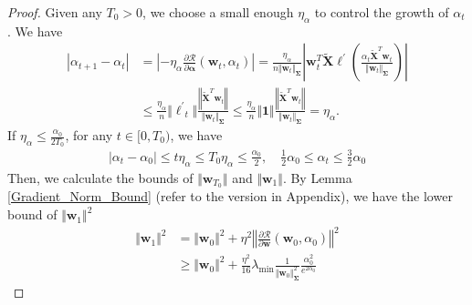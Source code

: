 \documentclass[pdflatex,sn-basic]{sn-jnl}%
\theoremstyle{thmstyleone}%
\begin{document}
\begin{appendices}
\begin{proof}
  Given any $T_0 > 0$, we choose a small enough $\eta_{\alpha}$ to control the growth of $\alpha_{t}$. 
  We have 
  \begin{equation*}
  \begin{aligned}
    \left| \alpha_{t+1} - \alpha_t \right|
    &= 
    \left| - \eta_{\alpha}\frac{\partial \mathcal{R}}{\partial \mathbf{\alpha}} \left(\mathbf{w}_t, \alpha_t \right) \right|
    =
    \frac{ \eta_{\alpha} }{n \Vert \mathbf{w}_t \Vert_\mathbf{\Sigma}}
    \left| 
      \mathbf{w}_t^T \tilde{\mathbf{X}}
      \boldsymbol{\ell^\prime}\left(
        \frac{
        \alpha_t \tilde{\mathbf{X}}^T \mathbf{w}_t
        }{\Vert \mathbf{w}_t \Vert_\mathbf{\Sigma}}
      \right)
    \right|
    \\ & \le
    \frac{\eta_{\alpha}}{n} \Vert \boldsymbol{\ell^{\prime}}_t \Vert 
    \frac{\left\Vert \tilde{\mathbf{X}}^T \mathbf{w}_t \right\Vert}{\Vert \mathbf{w}_t \Vert_{\mathbf{\Sigma}}}
    \le
    \frac{\eta_{\alpha}}{n} \Vert \mathbf{1} \Vert 
    \frac{\left\Vert \tilde{\mathbf{X}}^T \mathbf{w}_t \right\Vert}{\Vert \mathbf{w}_t \Vert_{\mathbf{\Sigma}}}
    = \eta_{\alpha}.
  \end{aligned}
  \end{equation*}
  If $\eta_{\alpha} \le \frac{\alpha_0}{2 T_0}$, for any $t \in [0, T_0)$, we have 
  \begin{equation*}
  \begin{aligned}
    | \alpha_{t} - \alpha_0 | \le t \eta_{\alpha} \le T_0 \eta_{\alpha} \le \frac{\alpha_0}{2},
    \quad 
    \frac{1}{2} \alpha_0 \le \alpha_{t} \le \frac{3}{2} \alpha_0
  \end{aligned}
  \end{equation*}
  Then, we calculate the bounds of $\Vert \mathbf{w}_{T_0} \Vert$ and $\Vert \mathbf{w}_{1} \Vert$. 
  By Lemma \ref{Gradient_Norm_Bound} (refer to the version in Appendix), we have the lower bound of $\Vert \mathbf{w}_{1} \Vert^2$
  \begin{equation*}
  \begin{aligned}
    \Vert \mathbf{w}_{1} \Vert^2 
    & = 
    \Vert \mathbf{w}_{0} \Vert^2 
    + \eta^2 
    \left\Vert 
        \frac{\partial \mathcal{R}}{\partial \mathbf{w}} \left(\mathbf{w}_0, \alpha_0\right)
    \right\Vert^2
    \\ & \ge 
    \Vert \mathbf{w}_{0} \Vert^2  
    + 
    \frac{\eta^2 }{16}
    \lambda_{\min}
    \frac{1}{\Vert \mathbf{w}_0 \Vert_{\mathbf{\Sigma}}^2}
    \frac{\alpha_0^2}{e^{2\alpha_0}}

\end{aligned}
\end{equation*}
\end{proof}
\end{appendices}
\end{document}
